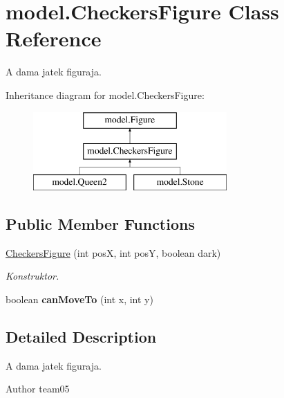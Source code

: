 \hypertarget{classmodel_1_1_checkers_figure}{}\section{model.\+Checkers\+Figure Class Reference}
\label{classmodel_1_1_checkers_figure}


A dama jatek figuraja.  


Inheritance diagram for model.\+Checkers\+Figure\+:\begin{figure}[H]
\begin{center}
\leavevmode
\includegraphics[height=3.000000cm]{classmodel_1_1_checkers_figure}
\end{center}
\end{figure}
\subsection*{Public Member Functions}
\begin{DoxyCompactItemize}
\item 
\hyperlink{classmodel_1_1_checkers_figure_a0895c32601056df41de919c5e20b76ab}{Checkers\+Figure} (int pos\+X, int pos\+Y, boolean dark)
\begin{DoxyCompactList}\small\item\em Konstruktor. \end{DoxyCompactList}\item 
\hypertarget{classmodel_1_1_checkers_figure_a8430b4bc382aa2e8b9d09511552490f8}{}boolean {\bfseries can\+Move\+To} (int x, int y)\label{classmodel_1_1_checkers_figure_a8430b4bc382aa2e8b9d09511552490f8}

\end{DoxyCompactItemize}


\subsection{Detailed Description}
A dama jatek figuraja. 

\begin{DoxyAuthor}{Author}
team05 
\end{DoxyAuthor}


